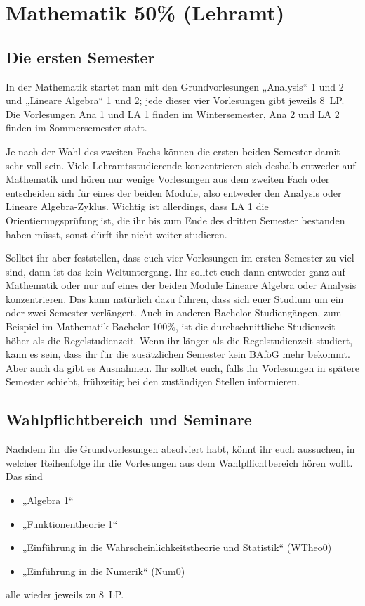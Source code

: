 \section{Mathematik 50\% (Lehramt)}

\subsection{Die ersten Semester}

In der Mathematik startet man mit den Grundvorlesungen „Analysis“ 1 und 2 und „Lineare Algebra“ 1 und 2; jede dieser vier Vorlesungen gibt jeweils 8~\gls{LP}. Die Vorlesungen Ana 1 und LA 1 finden im Wintersemester, Ana 2 und LA 2 finden im Sommersemester statt. 

Je nach der Wahl des zweiten Fachs können die ersten beiden Semester damit sehr voll sein. Viele Lehramtsstudierende konzentrieren sich deshalb entweder auf Mathematik und hören nur wenige Vorlesungen aus dem zweiten Fach oder entscheiden sich für eines der beiden Module, also entweder den Analysis oder Lineare Algebra-Zyklus. Wichtig ist allerdings, dass LA 1 die Orientierungsprüfung ist, die ihr bis zum Ende des dritten Semester bestanden haben müsst, sonst dürft ihr nicht weiter studieren.

Solltet ihr aber feststellen, dass euch vier Vorlesungen im ersten Semester zu viel sind, dann ist das kein Weltuntergang. Ihr solltet euch dann entweder ganz auf Mathematik oder nur auf eines der beiden Module Lineare Algebra oder Analysis konzentrieren. Das kann natürlich dazu führen, dass sich euer Studium um ein oder zwei Semester verlängert. Auch in anderen Bachelor-Studiengängen, zum Beispiel im Mathematik Bachelor 100\%, ist die durchschnittliche Studienzeit höher als die Regelstudienzeit. Wenn ihr länger als die Regelstudienzeit studiert, kann es sein, dass ihr für die zusätzlichen Semester kein BAföG mehr bekommt. Aber auch da gibt es Ausnahmen. Ihr solltet euch, falls ihr Vorlesungen in spätere Semester schiebt, frühzeitig bei den zuständigen Stellen informieren.

\subsection{Wahlpflichtbereich und Seminare}

Nachdem ihr die Grundvorlesungen absolviert habt, könnt ihr euch aussuchen, in welcher Reihenfolge ihr die Vorlesungen aus dem Wahlpflichtbereich hören wollt. Das sind
\begin{itemize}
  \item „Algebra 1“
  \item „Funktionentheorie 1“
  \item „Einführung in die Wahrscheinlichkeitstheorie und Statistik“ (\gls{WTheo0})
  \item „Einführung in die Numerik“ (\gls{Num0})
\end{itemize}
alle wieder jeweils zu 8~\gls{LP}. 

